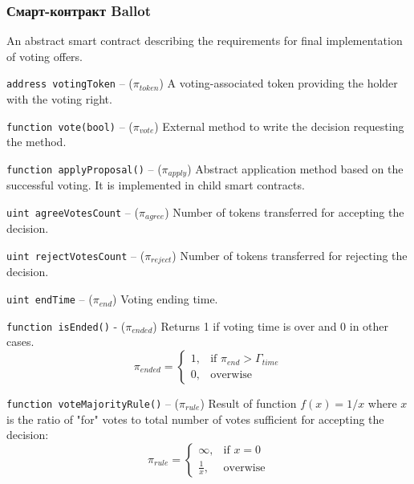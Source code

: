 \documentclass[12pt]{report}
\newcommand{\hlc}[1]{\colorbox{yellow!25}{#1}}
\def\code#1{\colorbox{light-gray}{\texttt{#1}}}
\begin{document}
\subsubsection{Смарт-контракт Ballot}
\label{tech-apps-voting-ballot}
\begin{multicols}{2}
An abstract smart contract describing the requirements for final implementation of voting offers.

\code{address votingToken} – ($\pi_{token}$)\hfill\null\linebreak
A voting-associated token providing the holder with the voting right.

\code{function vote(bool)} – ($\pi_{vote}$)\hfill\null\linebreak
External method to write the decision requesting the method.

\code{function applyProposal()} – ($\pi_{apply}$)\hfill\null\linebreak
Abstract application method based on the successful voting. It is implemented in child smart contracts.

\code{uint agreeVotesCount} – ($\pi_{agree}$)\hfill\null\linebreak
Number of tokens transferred for accepting the decision.

\code{uint rejectVotesCount} – ($\pi_{reject}$)\hfill\null\linebreak
Number of tokens transferred for rejecting the decision.

\code{uint endTime} – ($\pi_{end}$)\hfill\null\linebreak
Voting ending time.

\code{function isEnded()}  - ($\pi_{ended}$)\hfill\null\linebreak
Returns 1 if voting time is over and 0 in other cases.
\begin{equation}
\pi_{ended} = \begin{cases}
	1, & \text{if } \pi_{end} > \Gamma_{time} \\
	0, & \text{overwise}
\end{cases}
\end{equation}

\code{function voteMajorityRule()} – ($\pi_{rule}$)\hfill\null\linebreak 
\hlc{Result of function} $f(x) = 1/x$ where $x$ is the ratio of "for" votes to total number of votes sufficient for accepting the decision:
\begin{equation}
\pi_{rule} = \begin{cases}
	\infty, & \text{if } x = 0 \\
	\frac{1}{x}, & \text{overwise}
\end{cases}
\end{equation}


\end{multicols}
\end{document}
